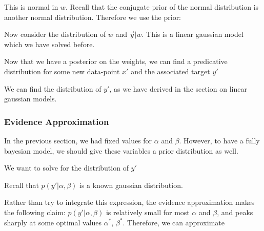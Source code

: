 \documentclass[12pt]{article}
\begin{document}
This is normal in $w$. Recall that the conjugate prior of the normal distribution is another normal distribution. Therefore we use the prior:


Now consider the distribution of $w$ and $\vec y | w$. This is a linear gaussian model which we have solved before. 


Now that we have a posterior on the weights, we can find a predicative distribution for some new data-point $x'$ and the associated target $y'$


We can find the distribution of $y'$, as we have derived in the section on linear gaussian models.


\subsubsection{Evidence Approximation}

In the previous section, we had fixed values for $\alpha$ and $\beta$. However, to have a fully bayesian model, we should give these variables a prior distribution as well.


We want to solve for the distribution of $y'$


Recall that $p(y'|\alpha, \beta)$ is a known gaussian distribution.

Rather than try to integrate this expression, the evidence approximation makes the following claim: $p(y'|\alpha, \beta)$ is relatively small for most $\alpha$ and $\beta$, and peaks sharply at some optimal values $\alpha^*$, $\beta^*$. Therefore, we can approximate
\end{document}
